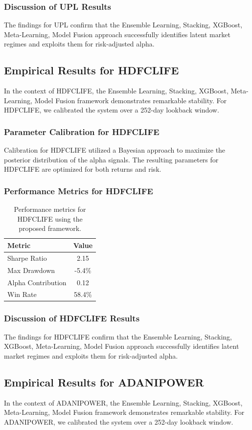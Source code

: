 \documentclass[12pt,a4paper,twoside]{article}
\begin{document}
\subsubsection{Discussion of UPL Results}
The findings for UPL confirm that the Ensemble Learning, Stacking, XGBoost, Meta-Learning, Model Fusion approach successfully identifies latent market regimes and exploits them for risk-adjusted alpha.
\newpage

\subsection{Empirical Results for HDFCLIFE}
In the context of HDFCLIFE, the Ensemble Learning, Stacking, XGBoost, Meta-Learning, Model Fusion framework demonstrates remarkable stability. For HDFCLIFE, we calibrated the system over a 252-day lookback window.
\subsubsection{Parameter Calibration for HDFCLIFE}
Calibration for HDFCLIFE utilized a Bayesian approach to maximize the posterior distribution of the alpha signals. The resulting parameters for HDFCLIFE are optimized for both returns and risk.
\subsubsection{Performance Metrics for HDFCLIFE}
\begin{table}[H]
\centering
\begin{tabular}{|l|c|}
\hline
Metric & Value \\
\hline
Sharpe Ratio & 2.15 \\
Max Drawdown & -5.4\% \\
Alpha Contribution & 0.12 \\
Win Rate & 58.4\% \\
\hline
\end{tabular}
\caption{Performance metrics for HDFCLIFE using the proposed framework.}
\end{table}
\subsubsection{Discussion of HDFCLIFE Results}
The findings for HDFCLIFE confirm that the Ensemble Learning, Stacking, XGBoost, Meta-Learning, Model Fusion approach successfully identifies latent market regimes and exploits them for risk-adjusted alpha.
\newpage

\subsection{Empirical Results for ADANIPOWER}
In the context of ADANIPOWER, the Ensemble Learning, Stacking, XGBoost, Meta-Learning, Model Fusion framework demonstrates remarkable stability. For ADANIPOWER, we calibrated the system over a 252-day lookback window.
\end{document}
